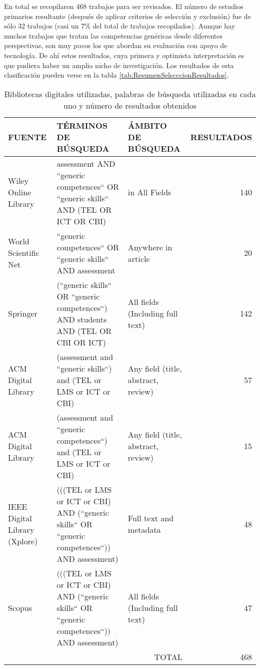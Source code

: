 

En total se recopilaron 468 trabajos para ser revisados. El número de estudios primarios resultante (después de aplicar criterios de selección y exclusión) fue de sólo 32 trabajos (casi un 7\% del total de trabajos recopilados). Aunque hay muchos trabajos que tratan las competencias genéricas desde diferentes perspectivas, son muy pocos los que abordan su evaluación con apoyo de tecnología. De ahí estos resultados, cuya primera y optimista interpretación es que pudiera haber un amplio nicho de investigación. Los resultados de esta clasificación pueden verse en la tabla \ref{tab:ResumenSelecccionResultados}.

\begin{table}[H]
  \begin{center}
  \begin{tabular}{| m{3.5cm} | m{6cm} | m{3cm} | r |}
    \hline
    FUENTE & TÉRMINOS DE BÚSQUEDA & ÁMBITO DE BÚSQUEDA & RESULTADOS \\
    \hline
    \hline
    Wiley Online Library & assessment AND ``generic competences`` OR ``generic skills`` AND (TEL OR ICT OR CBI) & in All Fields & 140 \\
    \hline
    World Scientific Net & ``generic competences`` OR ``generic skills`` AND assessment & Anywhere in article & 20\\
    \hline
    Springer & (``generic skills`` OR ``generic competences``) AND  students AND (TEL OR CBI OR ICT) & All fields (Including full text) & 142\\
    \hline
    ACM Digital Library & (assessment and ``generic skills``) and (TEL or LMS or ICT or CBI) & Any field (title, abstract, review) & 57\\
    \hline
    ACM Digital Library & (assessment and ``generic competences``) and (TEL or LMS or ICT or CBI) & Any field (title, abstract, review) & 15\\
    \hline
    IEEE Digital Library (Xplore) & (((TEL or LMS or ICT or CBI) AND (``generic skills`` OR ``generic competences``)) AND assessment) & Full text and metadata & 48\\
    \hline
    Scopus & (((TEL or LMS or ICT or CBI) AND (``generic skills`` OR ``generic competences``)) AND assessment) & All fields (Including full text) & 47\\
    \hline
    \multicolumn{3}{|r|}{TOTAL} & 468\\
    \hline
  \end{tabular}
\end{center}
\caption{Bibliotecas digitales utilizadas, palabras de búsqueda utilizadas en cada uno y número de resultados obtenidos}
\label{tab:ResumenBusquedaResultados}
\end{table} 


